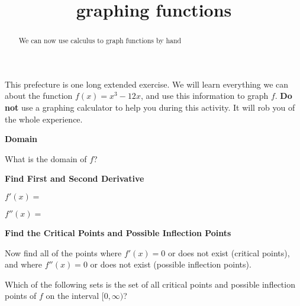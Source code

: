 \documentclass{ximera}
\title{graphing functions}
\begin{document}
\begin{abstract}
  We can now use calculus to graph functions by hand
\end{abstract}

\maketitle




This prefecture is one long extended exercise.  We will learn everything we can about the function $f(x) = x^3-12x$, and use this information to graph $f$.
\textbf{Do not} use a graphing calculator to help you during this activity.  It will rob you of the whole experience.



\textbf{Domain}

\begin{question}
What is the domain of $f$?
 
    \begin{multipleChoice}
    \end{multipleChoice}
    
\end{question}    


 \textbf{Find First and Second Derivative}
 
 \begin{question}
 	$f'(x)=$
 \end{question}
 
 \begin{question}
 	$f''(x)=$
 \end{question}
 
 \textbf{Find the Critical Points and Possible Inflection Points}
 
 \begin{question}
	Now find all of the points where $f'(x)=0$ or does not exist (critical points), and where $f''(x)=0$ or does not exist (possible inflection points).
	
	Which of the following sets is the set of all critical points and possible inflection points of $f$ on the interval $[0,\infty)$?
	
	 \begin{multipleChoice}
    \end{multipleChoice}

 \end{question}
 
\end{document}
